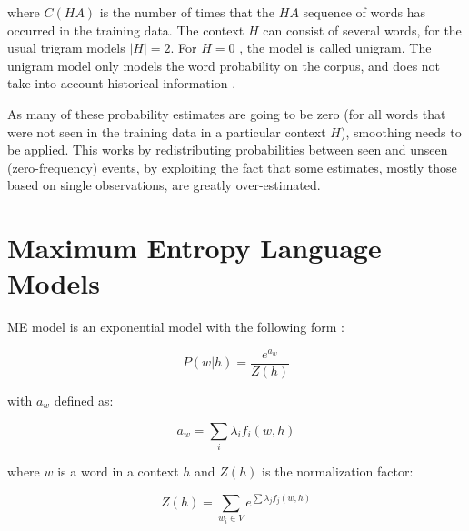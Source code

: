 where $C(HA)$ is the number of times that the $HA$ sequence of words has
occurred in the training data. The context $H$ can consist of several words,
for the usual trigram models $|H| = 2$. For $H = 0$ , the model is called
unigram. The unigram model only models the word probability on the corpus,
and does not take into account historical information
\cite{Manning:1999:FSN:311445, mikolovphd2012}. 

As many of these probability estimates are going to be zero (for all words that were not seen in the training data in a particular context $H$), smoothing needs to be applied. This works by redistributing probabilities between seen and unseen (zero-frequency) events, by exploiting the fact that some estimates, mostly those based on single observations, are greatly over-estimated. 


\section{Maximum Entropy Language Models}
\label{sec:max-ent-lm}

\ac{ME} model is an exponential model with the following form :

\begin{equation}
  \label{eq:max-ent-prob}
   P(w|h) = \frac{e^{a_w}}{Z(h)}
\end{equation}

with $a_w$ defined as:

\begin{equation}
  \label{eq:max-ent-pro-sub1}
  a_w = \sum_{i}{\lambda_i f_i(w,h)} 
\end{equation}

where $w$ is a word in a context $h$ and $Z(h)$ is  the normalization factor:

\begin{equation}
  \label{eq:max-ent-prob-sub2}
  Z(h) = \sum_{w_i \in V}{e^{\sum{\lambda_{j} f_j(w,h)}}} 
\end{equation}

